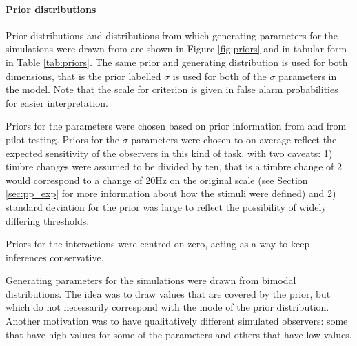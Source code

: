 \documentclass{article}\usepackage{knitr}
\begin{document}
\paragraph{Prior distributions}

Prior distributions and distributions from which generating parameters for the simulations were drawn from are shown in Figure \ref{fig:priors} and in tabular form in Table \ref{tab:priors}. The same prior and generating distribution is used for both dimensions, that is the prior labelled $\sigma$ is used for both of the $\sigma$ parameters in the model. Note that the scale for criterion is given in false alarm probabilities for easier interpretation. 

Priors for the parameters were chosen based on prior information from \citet{silbert2009, dai2011} and from pilot testing. Priors for the $\sigma$ parameters were chosen to on average reflect the expected sensitivity of the observers in this kind of task, with two caveats: 1) timbre changes were assumed to be divided by ten, that is a timbre change of 2 would correspond to a change of 20Hz on the original scale (see Section \ref{sec:pp_exp} \textit{} for more information about how the stimuli were defined) and 2) standard deviation for the prior was large to reflect the possibility of widely differing thresholds.

Priors for the interactions were centred on zero, acting as a way to keep inferences conservative.

Generating parameters for the simulations were drawn from bimodal distributions. The idea was to draw values that are covered by the prior, but which do not necessarily correspond with the mode of the prior distribution. Another motivation was to have qualitatively different simulated observers: some that have high values for some of the parameters and others that have low values.
\end{document}
